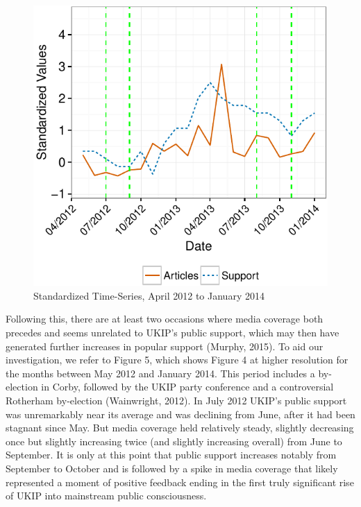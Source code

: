 \documentclass[12pt,article]{article}
\begin{document}
\begin{figure}[htbp]
\centering
\includegraphics{ukip_media_files/figure-latex/unnamed-chunk-10-1.pdf}
\caption{Standardized Time-Series, April 2012 to January 2014}
\end{figure}

Following this, there are at least two occasions where media coverage
both precedes and seems unrelated to UKIP's public support, which may
then have generated further increases in popular support (Murphy, 2015).
To aid our investigation, we refer to Figure 5, which shows Figure 4 at
higher resolution for the months between May 2012 and January 2014. This
period includes a by-election in Corby, followed by the UKIP party
conference and a controversial Rotherham by-election (Wainwright, 2012).
In July 2012 UKIP's public support was unremarkably near its average and
was declining from June, after it had been stagnant since May. But media
coverage held relatively steady, slightly decreasing once but slightly
increasing twice (and slightly increasing overall) from June to
September. It is only at this point that public support increases
notably from September to October and is followed by a spike in media
coverage that likely represented a moment of positive feedback ending in
the first truly significant rise of UKIP into mainstream public
consciousness.
\end{document}
